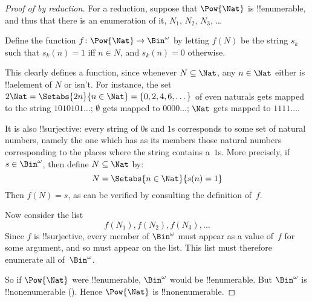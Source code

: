 \documentclass[../../../include/open-logic-section]{subfiles}
\begin{document}
\begin{proof}[Proof of {} by reduction]
For a reduction, suppose that $\Pow{\Nat}$ is !!{enumerable}, and thus that
there is an enumeration of it, $N_{1}$, $N_{2}$, $N_{3}$, \dots

Define the function $f \colon \Pow{\Nat} \to \Bin^\omega$ by letting
$f(N)$ be the string $s_{k}$ such that $s_{k}(n) = 1$ iff $n \in N$,
and $s_k(n) = 0$ otherwise.  

This clearly defines a function, since whenever $N \subseteq \Nat$,
any $n \in \Nat$ either is !!a{element} of $N$ or isn't.  For
instance, the set $2\Nat = \Setabs{2n}{n \in \Nat} = \{0,2, 4, 6,
\dots\}$ of even naturals gets mapped to the string $1010101\dots$;
$\emptyset$ gets mapped to $0000\dots$; $\Nat$ gets mapped to
$1111\dots$.

It is also !!{surjective}: every string of $0$s and $1$s corresponds
to some set of natural numbers, namely the one which has as its
members those natural numbers corresponding to the places where the string
contains a~$1$s. More precisely, if $s \in \Bin^\omega$, then define $N
\subseteq \Nat$ by:
\[
N = \Setabs{n \in \Nat}{s(n) = 1}
\]
Then $f(N) = s$, as can be verified by consulting the definition
of~$f$. 

Now consider the list
\[
f(N_1), f(N_2), f(N_3), \dots
\]
Since $f$ is !!{surjective}, every member of $\Bin^\omega$ must
appear as a value of~$f$ for some argument, and so must appear on the
list. This list must therefore enumerate all of~$\Bin^\omega$.

So if $\Pow{\Nat}$ were !!{enumerable}, $\Bin^\omega$ would be
!!{enumerable}.  But $\Bin^\omega$ is !!{nonenumerable}
(). Hence $\Pow{\Nat}$ is
!!{nonenumerable}.
\end{proof}

\end{document}
